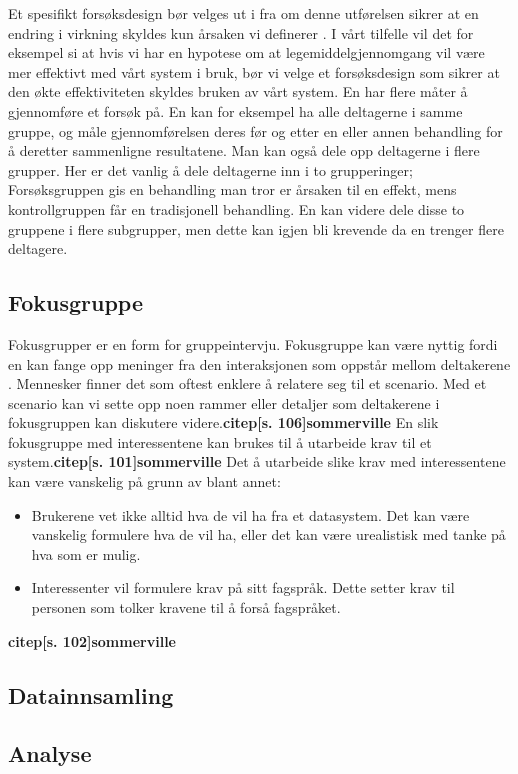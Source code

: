 Et spesifikt forsøksdesign bør velges ut i fra om denne utførelsen sikrer at en endring i virkning skyldes kun årsaken vi definerer \citep[s.134-135]{Researching_is}. I vårt tilfelle vil det for eksempel si at hvis vi har en hypotese om at legemiddelgjennomgang vil være mer effektivt med vårt system i bruk, bør vi velge et forsøksdesign som sikrer at den økte effektiviteten skyldes bruken av vårt system. En har flere måter å gjennomføre et forsøk på. En kan for eksempel ha alle deltagerne i samme gruppe, og måle gjennomførelsen deres før og etter en eller annen behandling for å deretter sammenligne resultatene. Man kan også dele opp deltagerne i flere grupper. Her er det vanlig å dele deltagerne inn i to grupperinger; Forsøksgruppen gis en behandling man tror er årsaken til en effekt, mens kontrollgruppen får en tradisjonell behandling. En kan videre dele disse to gruppene i flere subgrupper, men dette kan igjen bli krevende da en trenger flere deltagere. 

\subsection{Fokusgruppe} 
Fokusgrupper er en form for gruppeintervju. Fokusgruppe kan være nyttig fordi en kan fange opp meninger fra den interaksjonen som oppstår mellom deltakerene \citep[s. 106-107]{tjora}. Mennesker finner det som oftest enklere å relatere seg til et scenario. Med et scenario kan vi sette opp noen rammer eller detaljer som deltakerene i fokusgruppen kan diskutere videre.\textbf{citep[s. 106]{sommerville}} En slik fokusgruppe med interessentene kan brukes til å utarbeide krav til et system.\textbf{citep[s. 101]{sommerville}} Det å utarbeide slike krav med interessentene kan være vanskelig på grunn av blant annet: 
\begin{itemize}
\item Brukerene vet ikke alltid hva de vil ha fra et datasystem. Det kan være vanskelig formulere hva de vil ha, eller det kan være urealistisk med tanke på hva som er mulig.
\item Interessenter vil formulere krav på sitt fagspråk. Dette setter krav til personen som tolker kravene til å forså fagspråket.
\end{itemize} \textbf{citep[s. 102]{sommerville}}

\subsection{Datainnsamling}


\subsection{Analyse}

